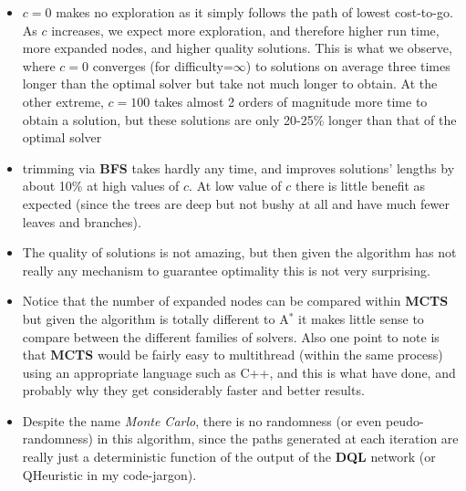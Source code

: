 \begin{itemize}
\item $c=0$ makes no exploration as it simply follows the path of lowest cost-to-go. As $c$ increases, we expect more exploration, and therefore higher run time, more expanded nodes, and higher quality solutions. This is what we observe, where $c=0$ converges (for difficulty=$\infty$) to solutions on average three times longer than the optimal solver but take not much longer to obtain. At the other extreme, $c=100$ takes almost 2 orders of magnitude more time to obtain a solution, but these solutions are only 20-25\% longer than that of the optimal solver
\item trimming via \textbf{BFS} takes hardly any time, and improves solutions' lengths by about 10\% at high values of $c$. At low value of $c$ there is little benefit as expected (since the trees are deep but not bushy at all and have much fewer leaves and branches).
\item The quality of solutions is not amazing, but then given the algorithm has not really any mechanism to guarantee optimality this is not very surprising. 
\item Notice that the number of expanded nodes can be compared within \textbf{MCTS} but given the algorithm is totally different to A$^{*}$ it makes little sense to compare between the different families of solvers. Also one point to note is that \textbf{MCTS} would be fairly easy to multithread (within the same process) using an appropriate language such as C++, and this is what \cite{https://doi.org/10.48550/arxiv.1805.07470} have done, and probably why they get considerably faster and better results.
\item Despite the name \textit{Monte Carlo}, there is no randomness (or even peudo-randomness) in this algorithm, since the paths generated at each iteration are really just a deterministic function of the output of the \textbf{DQL} network (or QHeuristic in my code-jargon).
\end{itemize}



